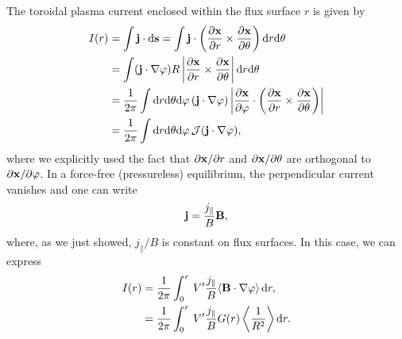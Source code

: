 \documentclass[11pt,a4paper]{article}
\newcommand{\rd}{\ensuremath{\mathrm{d}}}
\renewcommand{\b}[1]{\ensuremath{ {\bf #1 } }}
\begin{document}
The toroidal plasma current enclosed within the flux surface $r$ is given by
\begin{align}
I(r) &= \int \b{j}\cdot \rd\b{s} = \int \b{j}\cdot \left(\frac{\partial \b{x}}{\partial r}\times \frac{\partial \b{x}}{\partial \theta}\right) \rd r \rd \theta \nonumber \\
&= \int (\b{j}\cdot\nabla \varphi )R\left|\frac{\partial \b{x}}{\partial r}\times \frac{\partial \b{x}}{\partial \theta} \right| \rd r \rd \theta \nonumber \\
&= \frac{1}{2\pi} \int \rd r \rd\theta \rd\varphi \, (\b{j}\cdot\nabla \varphi )\left|\frac{\partial \b{x}}{\partial \varphi}\cdot\left(\frac{\partial \b{x}}{\partial r}\times \frac{\partial \b{x}}{\partial \theta} \right) \right|   \nonumber \\
&=\frac{1}{2\pi} \int \rd r \rd\theta \rd\varphi \, \mathcal{J}(\b{j}\cdot\nabla \varphi ),
\end{align}
where we explicitly used the fact that $\partial \b{x}/\partial r$ and $\partial \b{x}/\partial \theta$ are orthogonal to $\partial \b{x}/\partial \varphi$. In a force-free (pressureless) equilibrium, the perpendicular current vanishes and one can write 
\begin{align}
\b{j} = \frac{j_\parallel}{B}\b{B},
\end{align}
where, as we just showed, $j_\parallel/B$ is constant on flux surfaces. In this case, we can express
\begin{align}
I(r) &= \frac{1}{2\pi}\int_0^r \,V'\frac{j_\parallel}{B} \langle \b{B}\cdot\nabla \varphi \rangle \, \rd r, \nonumber \\
&=\frac{1}{2\pi}\int_0^r \,V'\frac{j_\parallel}{B}G(r) \left\langle \frac{1}{R^2}\right\rangle \rd r .
\end{align}
\end{document}
